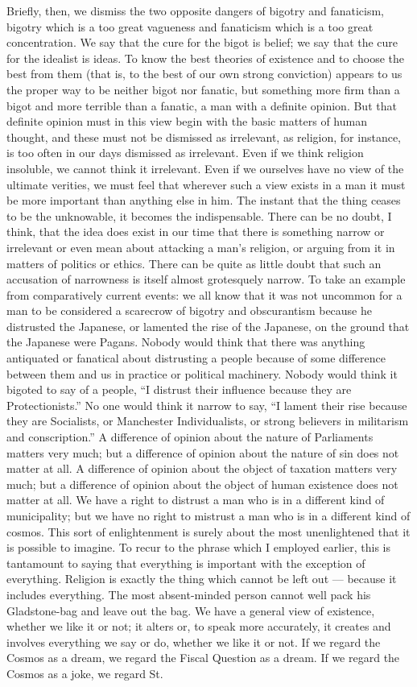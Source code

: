 Briefly, then, we dismiss the two opposite dangers of bigotry and fanaticism, bigotry which is a too great vagueness and fanaticism which is a too great concentration. We say that the cure for the bigot is belief; we say that the cure for the idealist is ideas. To know the best theories of existence and to choose the best from them (that is, to the best of our own strong conviction) appears to us the proper way to be neither bigot nor fanatic, but something more firm than a bigot and more terrible than a fanatic, a man with a definite opinion. But that definite opinion must in this view begin with the basic matters of human thought, and these must not be dismissed as irrelevant, as religion, for instance, is too often in our days dismissed as irrelevant. Even if we think religion insoluble, we cannot think it irrelevant. Even if we ourselves have no view of the ultimate verities, we must feel that wherever such a view exists in a man it must be more important than anything else in him. The instant that the thing ceases to be the unknowable, it becomes the indispensable. There can be no doubt, I think, that the idea does exist in our time that there is something narrow or irrelevant or even mean about attacking a man’s religion, or arguing from it in matters of politics or ethics. There can be quite as little doubt that such an accusation of narrowness is itself almost grotesquely narrow. To take an example from comparatively current events: we all know that it was not uncommon for a man to be considered a scarecrow of bigotry and obscurantism because he distrusted the Japanese, or lamented the rise of the Japanese, on the ground that the Japanese were Pagans. Nobody would think that there was anything antiquated or fanatical about distrusting a people because of some difference between them and us in practice or political machinery. Nobody would think it bigoted to say of a people, “I distrust their influence because they are Protectionists.” No one would think it narrow to say, “I lament their rise because they are Socialists, or Manchester Individualists, or strong believers in militarism and conscription.” A difference of opinion about the nature of Parliaments matters very much; but a difference of opinion about the nature of sin does not matter at all. A difference of opinion about the object of taxation matters very much; but a difference of opinion about the object of human existence does not matter at all. We have a right to distrust a man who is in a different kind of municipality; but we have no right to mistrust a man who is in a different kind of cosmos. This sort of enlightenment is surely about the most unenlightened that it is possible to imagine. To recur to the phrase which I employed earlier, this is tantamount to saying that everything is important with the exception of everything. Religion is exactly the thing which cannot be left out — because it includes everything. The most absent-minded person cannot well pack his Gladstone-bag and leave out the bag. We have a general view of existence, whether we like it or not; it alters or, to speak more accurately, it creates and involves everything we say or do, whether we like it or not. If we regard the Cosmos as a dream, we regard the Fiscal Question as a dream. If we regard the Cosmos as a joke, we regard St. 